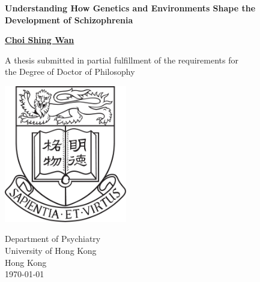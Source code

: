 \documentclass[12pt]{book}
\begin{document}
\thispagestyle{empty}
\pagestyle{empty}

\begin{singlespace}
	\begin{titlepage}
		\begin{center}
			\vspace*{1cm}
			
			\Huge
			\textbf{Understanding How Genetics and Environments Shape the Development of Schizophrenia}
			
			\vspace{0.5cm}
			\LARGE
			
			\vspace{1.5cm}
			
			\textbf{\href{mailto:choishingwan@gmail.com}{Choi Shing Wan}}
			
			\vfill
			
			A thesis submitted in partial fulfillment of the requirements for \\
			the Degree of Doctor of Philosophy
			
			\vspace{0.8cm}
			
			\includegraphics[width=0.4\textwidth]{figure/hkuLogo.jpg}
			
			\Large
			Department of Psychiatry\\
			University of Hong Kong\\
			Hong Kong\\
			\today
			
		\end{center}
	\end{titlepage}
\end{singlespace}


\frontmatter 
	\cleardoublepage
\end{document}
